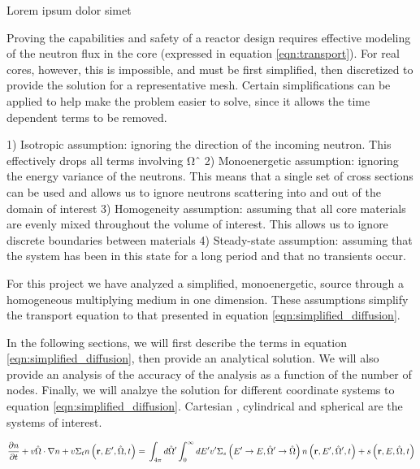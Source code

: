 \documentclass[../main.tex]{subfiles}
\begin{document}
Lorem ipsum dolor simet

Proving the capabilities and safety of a reactor design requires effective modeling of the neutron flux in the core (expressed in equation \ref{eqn:transport}). For real cores, however, this is impossible, and must be first simplified, then discretized to provide the solution for a representative mesh. Certain simplifications can be applied to help make the problem easier to solve, since it allows the time dependent terms to be removed.

1) Isotropic assumption: ignoring the direction of the incoming neutron. This effectively drops all terms involving Ωˆ
2) Monoenergetic assumption: ignoring the energy variance of the neutrons. This means that a single set of cross sections
can be used and allows us to ignore neutrons scattering into and out of the domain of interest
3) Homogeneity assumption: assuming that all core materials are evenly mixed throughout the volume of interest. This
allows us to ignore discrete boundaries between materials
4) Steady-state assumption: assuming that the system has been in this state for a long period and that no transients occur.



	For this project we have analyzed a simplified, monoenergetic, source through a homogeneous multiplying medium in one dimension. These assumptions simplify the transport equation to that presented in equation \ref{eqn:simplified_diffusion}.

	In the following sections, we will first describe the terms in equation \ref{eqn:simplified_diffusion}, then provide an analytical solution. We will also provide an analysis of the accuracy of the analysis as a function of the number of nodes. Finally, we will analzye the solution for different coordinate systems to equation \ref{eqn:simplified_diffusion}.  Cartesian , cylindrical and spherical are the systems of interest.

	\begin{equation}
		\pdv{n}{t} + v \hat{\Omega} \cdot \nabla n + v \Sigma_t n \left( \mathbf{r}, E^\prime, \hat{\Omega}, t \right) = \\ \int_{4\pi} d \hat{\Omega} ^\prime \int_0^{\infty} dE ^\prime v^\prime \Sigma_s\left( E ^\prime \rightarrow E, \hat{\Omega} ^\prime \rightarrow \hat{\Omega} \right) n\left( \mathbf{r}, E ^\prime, \hat{\Omega} ^\prime, t \right) + s\left( \mathbf{r}, E, \hat{\Omega}, t \right)
		\label{eqn:transport}
	\end{equation}
  
\end{document}
